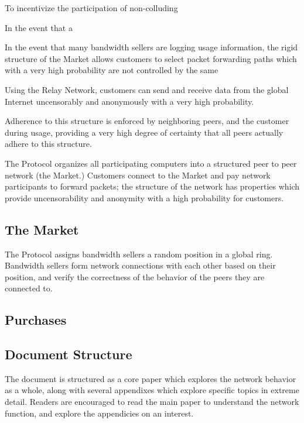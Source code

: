 To incentivize the participation of non-colluding

In the event that a

In the event that many bandwidth sellers are logging usage
information, the rigid structure of the \Orchid{} Market allows
customers to select packet forwarding paths which with a very high
probability are not controlled by the same

Using the Relay
Network, customers can send and receive data from the global Internet
uncensorably and anonymously with a very high probability.

Adherence to this structure is enforced by
neighboring peers, and the customer during usage, providing a very
high degree of certainty that all peers actually adhere to this
structure.

The \Orchid{} Protocol organizes all participating computers into a
structured peer to peer network (the \Orchid{} Market.) Customers
connect to the \Orchid{} Market and pay network participants to
forward packets; the structure of the network has properties which
provide uncensorability and anonymity with a high probability for
customers.



\subsection{The \Orchid{} Market}

The \Orchid{} Protocol assigns bandwidth sellers a random position in
a global ring. Bandwidth sellers form network connections with each
other based on their position, and verify the correctness of the
behavior of the peers they are connected to.

\subsection{Purchases}



\subsection{Document Structure}

The document is structured as a core paper which explores the network
behavior as a whole, along with several appendixes which explore
specific topics in extreme detail. Readers are encouraged to read the
main paper to understand the network function, and explore the
appendicies on an interest.
